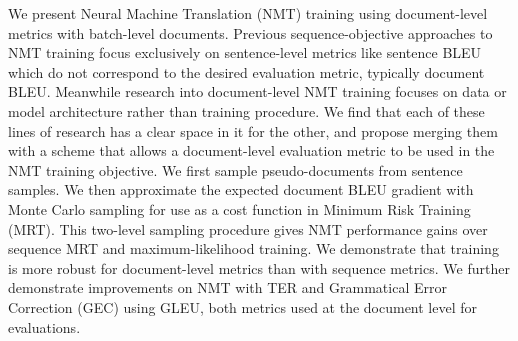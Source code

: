 We present Neural Machine Translation (NMT) training using document-level metrics with batch-level documents. Previous sequence-objective approaches to NMT training focus exclusively on sentence-level metrics like sentence BLEU which do not correspond to the desired evaluation metric, typically document BLEU. Meanwhile research into document-level NMT training focuses on data or model architecture rather than training procedure. We find that each of these lines of research has a clear space in it for the other, and propose merging them with a scheme that allows a document-level evaluation metric to be used in the NMT training objective. We first sample pseudo-documents from sentence samples. We then approximate the expected document BLEU gradient with Monte Carlo sampling for use as a cost function in Minimum Risk Training (MRT). This two-level sampling procedure gives NMT performance gains over sequence MRT and maximum-likelihood training. We demonstrate that training is more robust for document-level metrics than with sequence metrics. We further demonstrate improvements on NMT with TER and Grammatical Error Correction (GEC) using GLEU, both metrics used at the document level for evaluations.
